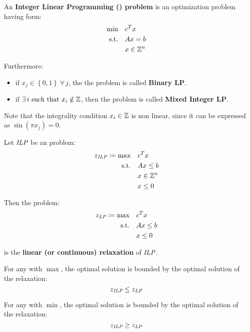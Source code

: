 \documentclass[english]{article}
\begin{document}
\begin{definition}
  \label{def:integer-linear-programming-problem}
  An \textbf{Integer Linear Programming (\ILP) problem} is an optimization problem having form:
  \begin{align*}
    \min        & \quad c^T x      \\
    \text{s.t.} & \quad Ax = b     \\
                & \quad x \in \mathbb{Z}^n
  \end{align*}

  Furthermore:

  \begin{itemize}
    \item if \(x_j \in \left\{ 0, 1 \right\} \ \forall \, j\), the the problem is called \textbf{Binary LP}.
    \item if \(\exists \, i \ \text{such that} \ x_i \notin \Z\), then the problem is called \textbf{Mixed Integer LP}.
  \end{itemize}
\end{definition}

Note that the integrality condition \(x_i \in \mathbb{Z}\) is non linear, since it can be expressed as \(\sin(\pi x_j) = 0\).

\begin{definition}
  Let \(\textit{ILP}\) be an \ILP problem:
  \begin{align*}
    z_{\textit{ILP}} \coloneqq \max & \quad c^T x      \\
    \text{s.t.}             & \quad Ax \leq b  \\
                            & \quad x \in \mathbb{Z}^n \\
                            & \quad x \leq 0
  \end{align*}

  Then the \LP problem:
  \begin{align*}
    z_{\textit{LP}} \coloneqq \max & \quad c^T x     \\
    \text{s.t.}            & \quad Ax \leq b \\
                           & \quad x \leq 0
  \end{align*}

  is the \textbf{linear (or continuous) relaxation} of \(\textit{ILP}\).
\end{definition}

\begin{property}
  \label{prop:bounds-of-ilp-solutions}

  For any \ILP with \(\max\), the optimal solution is bounded by the optimal solution of the \LP relaxation:
  \[ z_{\textit{ILP}} \leq z_{\textit{LP}} \]

  For any \ILP with \(\min\), the optimal solution is bounded by the optimal solution of the \LP relaxation:
  \[ z_{\textit{ILP}} \geq z_{\textit{LP}} \]

\end{property}
\end{document}
